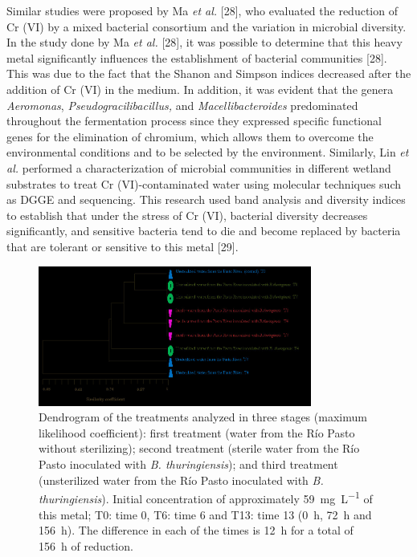 \documentclass{univsciauth}
\begin{document}
Similar studies were proposed by Ma \emph{et al.} {[}28{]}, who
evaluated the reduction of Cr (VI) by a mixed bacterial consortium and
the variation in microbial diversity. In the study done by Ma \emph{et
al.} {[}28{]}, it was possible to determine that this heavy metal
significantly influences the establishment of bacterial communities
{[}28{]}. This was due to the fact that the Shanon and Simpson indices
decreased after the addition of Cr (VI) in the medium. In addition, it
was evident that the genera \emph{Aeromonas},
\emph{Pseudogracilibacillus,} and \emph{Macellibacteroides} predominated
throughout the fermentation process since they expressed specific
functional genes for the elimination of chromium, which allows them to
overcome the environmental conditions and to be selected by the
environment. Similarly, Lin \emph{et al.} performed a characterization
of microbial communities in different wetland substrates to treat Cr
(VI)-contaminated water using molecular techniques such as DGGE and
sequencing. This research used band analysis and diversity indices to
establish that under the stress of Cr (VI), bacterial diversity
decreases significantly, and sensitive bacteria tend to die and become
replaced by bacteria that are tolerant or sensitive to this metal
{[}29{]}.
\begin{figure}[t!]
        \centering
        \includegraphics[width=0.8\textwidth]{figures/Figure5.jpg}
        \caption{
                Dendrogram of the treatments analyzed in three stages (maximum
                likelihood coefficient): first treatment (water from the Río
                Pasto without sterilizing); second treatment (sterile water
                from the Río Pasto inoculated with \emph{B. thuringiensis});
                and third treatment (unsterilized water from the Río Pasto
                inoculated with \emph{B.  thuringiensis}). Initial
                concentration of approximately \SI{59}{mg.L^{-1}} of this metal; T0: time
                0, T6: time 6 and T13: time 13 (\SI{0}{h}, \SI{72}{h} and \SI{156}{h}). The
                difference in each of the times is \SI{12}{h} for a total of
                \SI{156}{h} of reduction.
        }
        \label{fig:5}
\end{figure}
\end{document}
